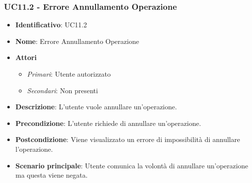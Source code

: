 \subsubsection{UC11.2 - Errore Annullamento Operazione}
\begin{itemize}
	\item \textbf{Identificativo}: UC11.2
	\item \textbf{Nome}: Errore Annullamento Operazione 
	\item \textbf{Attori}
	\begin{itemize} 
		\item \textit{Primari}: Utente autorizzato
		\item \textit{Secondari}: Non presenti
	\end{itemize}
	\item \textbf{Descrizione}: L'utente vuole annullare un'operazione.
	\item \textbf{Precondizione}: L'utente richiede di annullare un'operazione.
	\item \textbf{Postcondizione}: Viene visualizzato un errore di impossibilità di annullare l'operazione.
	\item \textbf{Scenario principale}: Utente comunica la volontà di annullare un'operazione ma questa viene negata.
\end{itemize}